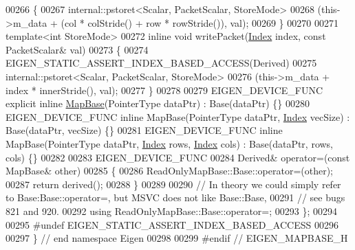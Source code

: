 \begin{DoxyCode}
00266     \{
00267       internal::pstoret<Scalar, PacketScalar, StoreMode>
00268                (this->m\_data + (col * colStride() + row * rowStride()), val);
00269     \}
00270 
00271     \textcolor{keyword}{template}<\textcolor{keywordtype}{int} StoreMode>
00272     \textcolor{keyword}{inline} \textcolor{keywordtype}{void} writePacket(\hyperlink{namespace_eigen_a62e77e0933482dafde8fe197d9a2cfde}{Index} index, \textcolor{keyword}{const} PacketScalar& val)
00273     \{
00274       EIGEN\_STATIC\_ASSERT\_INDEX\_BASED\_ACCESS(Derived)
00275       internal::pstoret<Scalar, PacketScalar, StoreMode>
00276                 (this->m\_data + index * innerStride(), val);
00277     \}
00278 
00279     EIGEN\_DEVICE\_FUNC \textcolor{keyword}{explicit} \textcolor{keyword}{inline} \hyperlink{class_eigen_1_1_map_base}{MapBase}(PointerType dataPtr) : Base(dataPtr) \{\}
00280     EIGEN\_DEVICE\_FUNC \textcolor{keyword}{inline} MapBase(PointerType dataPtr, \hyperlink{namespace_eigen_a62e77e0933482dafde8fe197d9a2cfde}{Index} vecSize) : Base(dataPtr, vecSize) \{\}
00281     EIGEN\_DEVICE\_FUNC \textcolor{keyword}{inline} MapBase(PointerType dataPtr, \hyperlink{namespace_eigen_a62e77e0933482dafde8fe197d9a2cfde}{Index} rows, \hyperlink{namespace_eigen_a62e77e0933482dafde8fe197d9a2cfde}{Index} cols) : Base(dataPtr,
       rows, cols) \{\}
00282 
00283     EIGEN\_DEVICE\_FUNC
00284     Derived& operator=(\textcolor{keyword}{const} MapBase& other)
00285     \{
00286       ReadOnlyMapBase::Base::operator=(other);
00287       \textcolor{keywordflow}{return} derived();
00288     \}
00289 
00290     \textcolor{comment}{// In theory we could simply refer to Base:Base::operator=, but MSVC does not like Base::Base,}
00291     \textcolor{comment}{// see bugs 821 and 920.}
00292     \textcolor{keyword}{using} ReadOnlyMapBase::Base::operator=;
00293 \};
00294 
00295 \textcolor{preprocessor}{#undef EIGEN\_STATIC\_ASSERT\_INDEX\_BASED\_ACCESS}
00296 
00297 \} \textcolor{comment}{// end namespace Eigen}
00298 
00299 \textcolor{preprocessor}{#endif // EIGEN\_MAPBASE\_H}
\end{DoxyCode}
